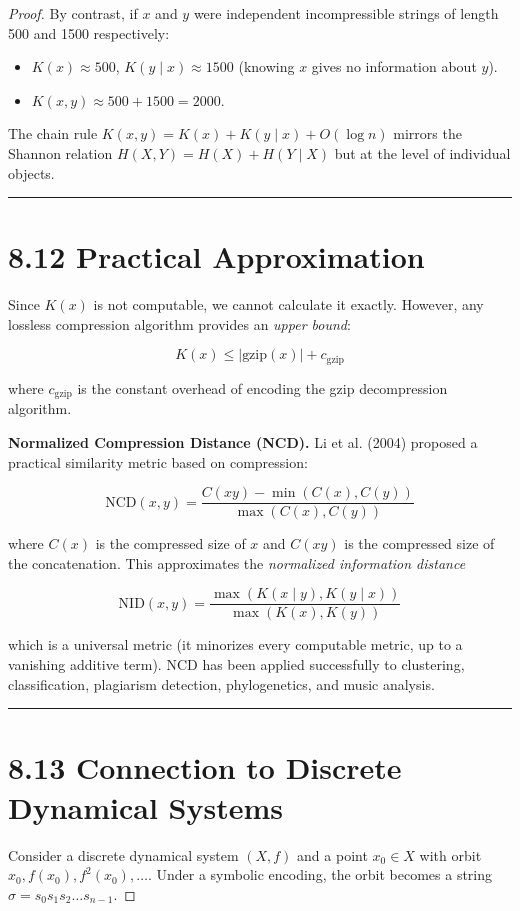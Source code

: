 \begin{proof}
By contrast, if $x$ and $y$ were independent incompressible strings of length 500 and 1500 respectively:
\begin{itemize}
  \item $K(x) \approx 500$, $K(y \mid x) \approx 1500$ (knowing $x$ gives no information about $y$).
  \item $K(x, y) \approx 500 + 1500 = 2000$.
\end{itemize}

The chain rule $K(x, y) = K(x) + K(y \mid x) + O(\log n)$ mirrors the Shannon relation $H(X, Y) = H(X) + H(Y \mid X)$ but at the level of individual objects.

\bigskip\hrule\bigskip

\section{8.12 Practical Approximation}

Since $K(x)$ is not computable, we cannot calculate it exactly. However, any lossless compression algorithm provides an \textit{upper bound}:

\[
K(x) \leq |\text{gzip}(x)| + c_{\text{gzip}}
\]

where $c_{\text{gzip}}$ is the constant overhead of encoding the gzip decompression algorithm.

\textbf{Normalized Compression Distance (NCD).} Li et al. (2004) proposed a practical similarity metric based on compression:

\[
\text{NCD}(x, y) = \frac{C(xy) - \min(C(x), C(y))}{\max(C(x), C(y))}
\]

where $C(x)$ is the compressed size of $x$ and $C(xy)$ is the compressed size of the concatenation. This approximates the \textit{normalized information distance}

\[
\text{NID}(x, y) = \frac{\max(K(x \mid y), K(y \mid x))}{\max(K(x), K(y))}
\]

which is a universal metric (it minorizes every computable metric, up to a vanishing additive term). NCD has been applied successfully to clustering, classification, plagiarism detection, phylogenetics, and music analysis.

\bigskip\hrule\bigskip

\section{8.13 Connection to Discrete Dynamical Systems}

Consider a discrete dynamical system $(X, f)$ and a point $x_0 \in X$ with orbit $x_0, f(x_0), f^2(x_0), \ldots$. Under a symbolic encoding, the orbit becomes a string $\sigma = s_0 s_1 s_2 \ldots s_{n-1}$.


\end{proof}
